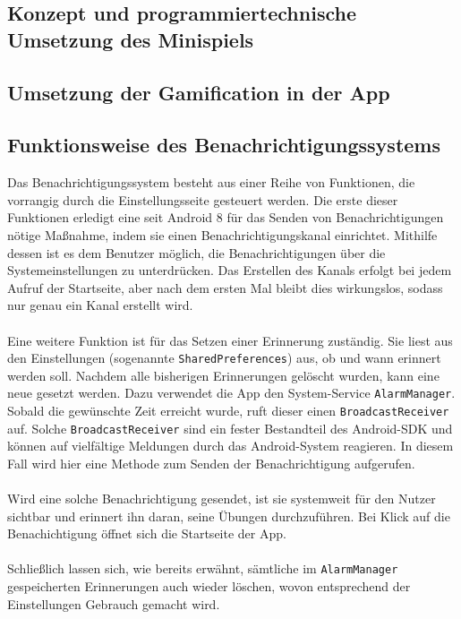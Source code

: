 \subsection{Konzept und programmiertechnische Umsetzung des Minispiels}
\newpage
\subsection{Umsetzung der Gamification in der App}
\newpage
\subsection{Funktionsweise des Benachrichtigungssystems}
Das Benachrichtigungssystem besteht aus einer Reihe von Funktionen, die vorrangig durch die Einstellungsseite gesteuert werden. Die erste dieser Funktionen erledigt eine seit Android 8 für das Senden von Benachrichtigungen nötige Maßnahme, indem sie einen Benachrichtigungskanal einrichtet. Mithilfe dessen ist es dem Benutzer möglich, die Benachrichtigungen über die Systemeinstellungen zu unterdrücken. Das Erstellen des Kanals erfolgt bei jedem Aufruf der Startseite, aber nach dem ersten Mal bleibt dies wirkungslos, sodass nur genau ein Kanal erstellt wird. \\ \\
Eine weitere Funktion ist für das Setzen einer Erinnerung zuständig. Sie liest aus den Einstellungen (sogenannte \texttt{SharedPreferences}) aus, ob und wann erinnert werden soll. Nachdem alle bisherigen Erinnerungen gelöscht wurden, kann eine neue gesetzt werden. Dazu verwendet die App den System-Service \texttt{AlarmManager}. Sobald die gewünschte Zeit erreicht wurde, ruft dieser einen \texttt{BroadcastReceiver} auf. Solche \texttt{BroadcastReceiver} sind ein fester Bestandteil des Android-SDK und können auf vielfältige Meldungen durch das Android-System reagieren. In diesem Fall wird hier eine Methode zum Senden der Benachrichtigung aufgerufen. \\ \\
Wird eine solche Benachrichtigung gesendet, ist sie systemweit für den Nutzer sichtbar und erinnert ihn daran, seine Übungen durchzuführen. Bei Klick auf die Benachichtigung öffnet sich die Startseite der App. \\ \\
Schließlich lassen sich, wie bereits erwähnt, sämtliche im \texttt{AlarmManager} gespeicherten Erinnerungen auch wieder löschen, wovon entsprechend der Einstellungen Gebrauch gemacht wird.